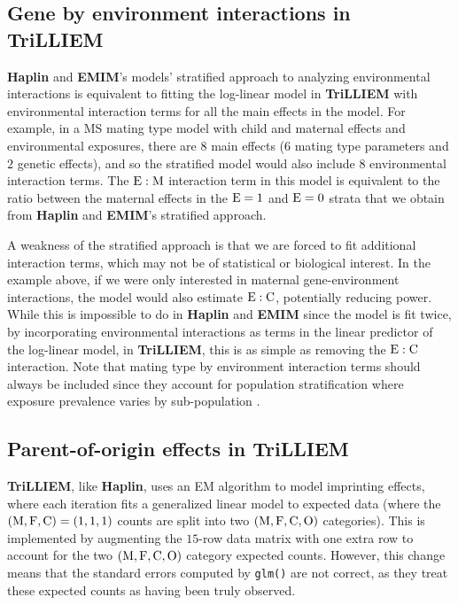 \subsection{Gene by environment interactions in TriLLIEM}

\textbf{Haplin} and \textbf{EMIM}'s models' stratified approach to analyzing environmental interactions is equivalent to fitting the log-linear model in \textbf{TriLLIEM} with environmental interaction terms for all the main effects in the model.
For example, in a MS mating type model with child and maternal effects and environmental exposures, there are $8$ main effects ($6$ mating type parameters and $2$ genetic effects), and so the stratified model would also include $8$ environmental interaction terms.
The ${\rm E}:{\rm M}$ interaction term in this model is equivalent to the ratio between the maternal effects in the ${\rm E} = 1$ and ${\rm E} = 0$ strata that we obtain from \textbf{Haplin} and \textbf{EMIM}'s stratified approach.

A weakness of the stratified approach is that we are forced to fit additional interaction terms, which may not be of statistical or biological interest.
In the example above, if we were only interested in maternal gene-environment interactions, the model would also estimate ${\rm E}:{\rm C}$, potentially reducing power.
While this is impossible to do in \textbf{Haplin} and \textbf{EMIM} since the model is fit twice, by incorporating environmental interactions as terms in the linear predictor of the log-linear model, in \textbf{TriLLIEM}, this is as simple as removing the ${\rm E}:{\rm C}$ interaction.
Note that mating type by environment interaction terms should always be included since they account for population stratification where exposure prevalence varies by sub-population \cite{UmbaWein00, Shin+10}.

\subsection{Parent-of-origin effects in TriLLIEM}

\textbf{TriLLIEM}, like \textbf{Haplin}, uses an EM algorithm to model imprinting effects, where each iteration fits a generalized linear model to expected data (where the $({\rm M}, {\rm F}, {\rm C}) = (1,1,1)$ counts are split into two $({\rm M}, {\rm F}, {\rm C}, {\rm O})$ categories).
This is implemented by augmenting the $15$-row data matrix with one extra row to account for the two $({\rm M},{\rm F},{\rm C},{\rm O})$ category expected counts.
However, this change means that the standard errors computed by \texttt{glm()} are not correct, as they treat these expected counts as having been truly observed.

